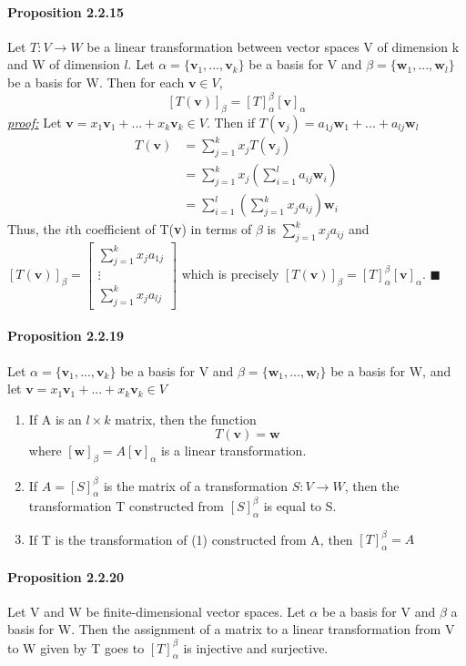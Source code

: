 \documentclass[11pt]{article}
\newcommand{\tb}[1]{\textbf{#1}}
\newcommand{\proof}[0]{\textit{\underline{proof:} }}
\newcommand{\litran}[0]{$T: V \rightarrow W$ }
\begin{document}
{\paragraph{Proposition 2.2.15} Let \litran be a linear transformation between vector spaces V of dimension k and W of dimension $l$. Let $\alpha = \{\tb{v}_1,...,\tb{v}_k\}$ be a basis for V and $\beta = \{\tb{w}_1,...,\tb{w}_l\}$ be a basis for W. Then for each $\tb{v} \in V$, $$[T(\tb{v})]_\beta = [T]^\beta_\alpha[\tb{v}]_\alpha$$
\proof Let $\tb{v} = x_1\tb{v}_1 + ...+x_k\tb{v}_k \in V$. Then if $T(\tb{v}_j) = a_{1j}\tb{w}_1 + ...+ a_{lj}\tb{w}_l$
\begin{align*}
	T(\tb{v}) &= \sum_{j=1}^kx_jT(\tb{v}_j)\\
	&=\sum_{j=1}^kx_j(\sum_{i=1}^la_{ij}\tb{w}_i)\\
	&=\sum_{i=1}^l(\sum_{j=1}^kx_ja_{ij})\tb{w}_i
\end{align*}
Thus, the $i$th coefficient of T(\tb{v}) in terms of $\beta$ is $\sum_{j=1}^kx_ja_{ij}$ and 
$[T(\tb{v})]_\beta = \begin{bmatrix}
	\sum_{j=1}^kx_ja_{1j}\\
	\vdots\\
	\sum_{j=1}^kx_ja_{lj}
\end{bmatrix}$ which is precisely $[T(\tb{v})]_\beta = [T]^\beta_\alpha[\tb{v}]_\alpha$. $\blacksquare$

\paragraph{Proposition 2.2.19} 
 Let $\alpha = \{\tb{v}_1,...,\tb{v}_k\}$ be a basis for V and $\beta = \{\tb{w}_1,...,\tb{w}_l\}$ be a basis for W, and let $\tb{v} = x_1\tb{v}_1 +...+x_k\tb{v}_k \in V$
 \begin{enumerate}
 	\item If A is an $l \times k$ matrix, then the function $$T(\tb{v}) = \tb{w}$$
 	where $[\tb{w}]_\beta = A[\tb{v}]_\alpha$ is a linear transformation.
 	\item If $A = [S]_\alpha^\beta$ is the matrix of a transformation $S: V \rightarrow W$, then the transformation T constructed from $[S]_\alpha^\beta$ is equal to S.
 	\item If T is the transformation of (1) constructed from A, then $[T]_\alpha^\beta = A$
 \end{enumerate}
 
 \paragraph{Proposition 2.2.20} Let V and W be finite-dimensional vector spaces. Let $\alpha$ be a basis for V and $\beta$ a basis for W. Then the assignment of a matrix to a linear transformation from V to W given by T goes to $[T]_\alpha^\beta$ is injective and surjective.
}
\end{document}
